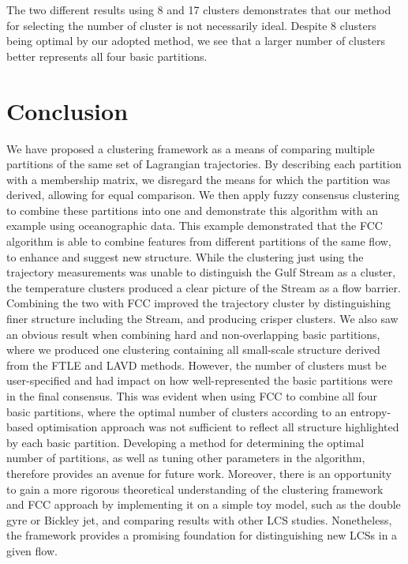 \documentclass[a4paper, fontsize=12pt]{article}
\begin{document}
The two different results using 8 and 17 clusters demonstrates that our method for selecting the number of cluster is not necessarily ideal. Despite 8 clusters being optimal by our adopted method, we see that a larger number of clusters better represents all four basic partitions.


\section{Conclusion}
We have proposed a clustering framework as a means of comparing multiple partitions of the same set of Lagrangian trajectories. By describing each partition with a membership matrix, we disregard the means for which the partition was derived, allowing for equal comparison. We then apply fuzzy consensus clustering to combine these partitions into one and demonstrate this algorithm with an example using oceanographic data. This example demonstrated that the FCC algorithm is able to combine features from different partitions of the same flow, to enhance and suggest new structure. While the clustering just using the trajectory measurements was unable to distinguish the Gulf Stream as a cluster, the temperature clusters produced a clear picture of the Stream as a flow barrier. Combining the two with FCC improved the trajectory cluster by distinguishing finer structure including the Stream, and producing crisper clusters. We also saw an obvious result when combining hard and non-overlapping basic partitions, where we produced one clustering containing all small-scale structure derived from the FTLE and LAVD methods. However, the number of clusters must be user-specified and had impact on how well-represented the basic partitions were in the final consensus. This was evident when using FCC to combine all four basic partitions, where the optimal number of clusters according to an entropy-based optimisation approach was not sufficient to reflect all structure highlighted by each basic partition. Developing a method for determining the optimal number of partitions, as well as tuning other parameters in the algorithm, therefore provides an avenue for future work. Moreover, there is an opportunity to gain a more rigorous theoretical understanding of the clustering framework and FCC approach by implementing it on a simple toy model, such as the double gyre or Bickley jet, and comparing results with other LCS studies. Nonetheless, the framework provides a promising foundation for distinguishing new LCSs in a given flow.
\end{document}

